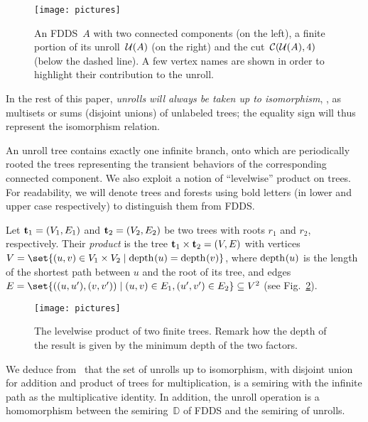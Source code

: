 \begin{figure}[t]
\centering
\texttt{[image: pictures]}
\caption{An FDDS~$A$ with two connected components (on the left), a finite portion of its unroll~$\mathcal{U}(A)$ (on the right) and the cut~$\mathcal{C}(\mathcal{U}(A),4)$ (below the dashed line). A few vertex names are shown in order to highlight their contribution to the unroll.}
\label{fig:unroll}
\end{figure}

In the rest of this paper, \emph{unrolls will always be taken up to isomorphism}, \ie, as multisets or sums (disjoint unions) of unlabeled trees; the equality sign will thus represent the isomorphism relation.

An unroll tree contains exactly one infinite branch, onto which are periodically rooted the trees representing the transient behaviors of the corresponding connected component. 
We also exploit a notion of ``levelwise'' product on trees. 
For readability, we will denote trees and forests using bold letters (in lower and upper case
respectively) to distinguish them from FDDS.

\begin{definition}\label{prodintrees} 
	Let $\tree{t}_1=(V_1,E_1)$ and $\tree{t}_2=(V_2,E_2)$ be two trees with roots $r_1$ and $r_2$, respectively.
        Their \emph{product} is the tree $\tree{t}_1 \times \tree{t}_2=(V,E)$ with vertices
        $V=\set{(u,v)\in V_1\times V_2 \mid \depth{u}=\depth{v}}$, where $\mathrm{depth}_{}(u)$ is the length of the shortest path between $u$ and the root of its tree, and edges $E=\set{((u,u'),(v,v')) \mid (u,v)\in E_1, (u',v')\in E_2}\subseteq V^2$ (see Fig.~\ref{fig:tree-product}).
\end{definition}

\begin{figure}[t]
\centering
\texttt{[image: pictures]}
\caption{The levelwise product of two finite trees. Remark how the depth of the result is given by the minimum depth of the two factors.}
\label{fig:tree-product}
\end{figure}

We deduce from~\cite{article_arbre} that the set of unrolls up to isomorphism, with disjoint union for addition and product of trees for multiplication, is a semiring with the infinite path as the multiplicative identity.
In addition, the unroll operation is a homomorphism between the semiring~$\mathbb{D}$ of FDDS and the semiring of unrolls.

